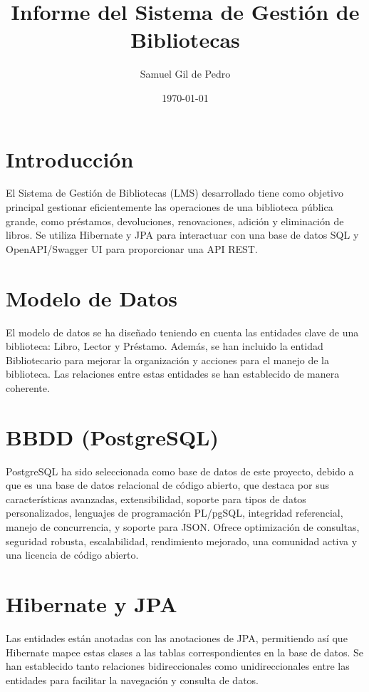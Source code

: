 \documentclass{article}
\title{Informe del Sistema de Gestión de Bibliotecas}
\author{Samuel Gil de Pedro}
\date{\today}
\begin{document}
\maketitle

\section{Introducción}
El Sistema de Gestión de Bibliotecas (LMS) desarrollado tiene como objetivo principal gestionar eficientemente las operaciones de una biblioteca pública grande, como préstamos, devoluciones, renovaciones, adición y eliminación de libros. Se utiliza Hibernate y JPA para interactuar con una base de datos SQL y OpenAPI/Swagger UI para proporcionar una API REST.

\section{Modelo de Datos}
El modelo de datos se ha diseñado teniendo en cuenta las entidades clave de una biblioteca: Libro, Lector y Préstamo. Además, se han incluido la entidad Bibliotecario para mejorar la organización y acciones para el manejo de la biblioteca. Las relaciones entre estas entidades se han establecido de manera coherente.

\section{BBDD (PostgreSQL)}
PostgreSQL ha sido seleccionada como base de datos de este proyecto, debido a que es una base de datos relacional de código abierto, que destaca por sus características avanzadas, extensibilidad, soporte para tipos de datos personalizados, lenguajes de programación PL/pgSQL, integridad referencial, manejo de concurrencia, y soporte para JSON. Ofrece optimización de consultas, seguridad robusta, escalabilidad, rendimiento mejorado, una comunidad activa y una licencia de código abierto.

\section{Hibernate y JPA}
Las entidades están anotadas con las anotaciones de JPA, permitiendo así que Hibernate mapee estas clases a las tablas correspondientes en la base de datos. Se han establecido tanto relaciones bidireccionales como unidireccionales entre las entidades para facilitar la navegación y consulta de datos.
\end{document}
